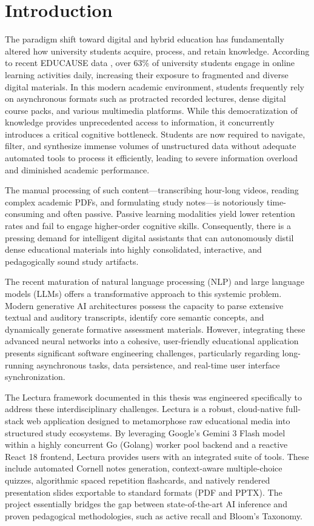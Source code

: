 \chapter{Introduction}
\label{chap:intro}

The paradigm shift toward digital and hybrid education has fundamentally altered how university students acquire, process, and retain knowledge. According to recent EDUCAUSE data \cite{educause2022students}, over 63\% of university students engage in online learning activities daily, increasing their exposure to fragmented and diverse digital materials. In this modern academic environment, students frequently rely on asynchronous formats such as protracted recorded lectures, dense digital course packs, and various multimedia platforms. While this democratization of knowledge provides unprecedented access to information, it concurrently introduces a critical cognitive bottleneck. Students are now required to navigate, filter, and synthesize immense volumes of unstructured data without adequate automated tools to process it efficiently, leading to severe information overload and diminished academic performance.

The manual processing of such content—transcribing hour-long videos, reading complex academic PDFs, and formulating study notes—is notoriously time-consuming and often passive. Passive learning modalities yield lower retention rates and fail to engage higher-order cognitive skills. Consequently, there is a pressing demand for intelligent digital assistants that can autonomously distil dense educational materials into highly consolidated, interactive, and pedagogically sound study artifacts. 

The recent maturation of natural language processing (NLP) and large language models (LLMs) offers a transformative approach to this systemic problem. Modern generative AI architectures possess the capacity to parse extensive textual and auditory transcripts, identify core semantic concepts, and dynamically generate formative assessment materials. However, integrating these advanced neural networks into a cohesive, user-friendly educational application presents significant software engineering challenges, particularly regarding long-running asynchronous tasks, data persistence, and real-time user interface synchronization.

The Lectura framework documented in this thesis was engineered specifically to address these interdisciplinary challenges. Lectura is a robust, cloud-native full-stack web application designed to metamorphose raw educational media into structured study ecosystems. By leveraging Google's Gemini 3 Flash model within a highly concurrent Go (Golang) worker pool backend and a reactive React 18 frontend, Lectura provides users with an integrated suite of tools. These include automated Cornell notes generation, context-aware multiple-choice quizzes, algorithmic spaced repetition flashcards, and natively rendered presentation slides exportable to standard formats (PDF and PPTX). The project essentially bridges the gap between state-of-the-art AI inference and proven pedagogical methodologies, such as active recall and Bloom's Taxonomy.

